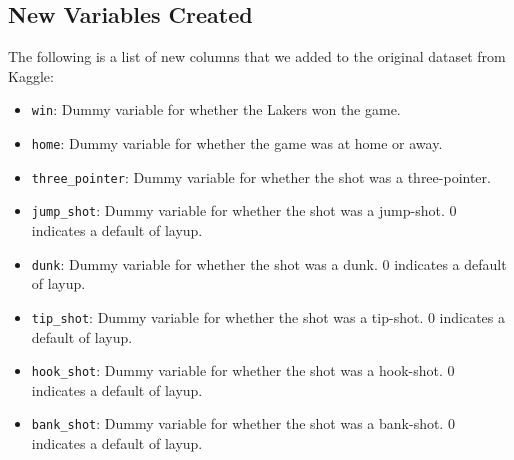 \documentclass[paper=a4, fontsize=11pt]{scrartcl} %
\numberwithin{equation}{section} %
\numberwithin{figure}{section} %
\numberwithin{table}{section} %
\begin{document}
	\subsection{New Variables Created}
	The following is a list of new columns that we added to the original dataset from Kaggle:
	\begin{itemize}
	\item \texttt{win}: Dummy variable for whether the Lakers won the game.
	\item \texttt{home}: Dummy variable for whether the game was at home or away.
	\item \texttt{three\_pointer}: Dummy variable for whether the shot was a three-pointer.
	\item \texttt{jump\_shot}: Dummy variable for whether the shot was a jump-shot. $0$ indicates a default of layup.
	\item \texttt{dunk}: Dummy variable for whether the shot was a dunk. $0$ indicates a default of layup.
	\item \texttt{tip\_shot}: Dummy variable for whether the shot was a tip-shot. $0$ indicates a default of layup.
	\item \texttt{hook\_shot}: Dummy variable for whether the shot was a hook-shot. $0$ indicates a default of layup.
	\item \texttt{bank\_shot}: Dummy variable for whether the shot was a bank-shot. $0$ indicates a default of layup.


\end{itemize}
\end{document}
